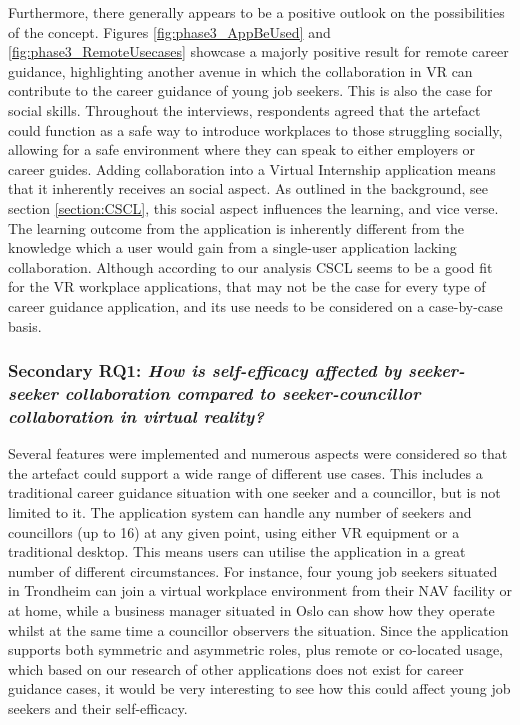 Furthermore, there generally appears to be a positive outlook on the possibilities of the concept. Figures \ref{fig:phase3_AppBeUsed} and \ref{fig:phase3_RemoteUsecases} showcase a majorly positive result for remote career guidance, highlighting another avenue in which the collaboration in VR can contribute to the career guidance of young job seekers. This is also the case for social skills. Throughout the interviews, respondents agreed that the artefact could function as a safe way to introduce workplaces to those struggling socially, allowing for a safe environment where they can speak to either employers or career guides. Adding collaboration into a Virtual Internship application means that it inherently receives an social aspect. As outlined in the background, see section \ref{section:CSCL}, this social aspect influences the  learning, and vice verse. The learning outcome from the application is inherently different from the knowledge which a user would gain from a single-user application lacking collaboration. Although according to our analysis CSCL seems to be a good fit for the VR workplace applications, that may not be the case for every type of career guidance application, and its use needs to be considered on a case-by-case basis.  







\subsubsection{Secondary RQ1: \textit{How is self-efficacy affected by seeker-seeker collaboration compared to seeker-councillor collaboration in virtual reality?}} 

Several features were implemented and numerous aspects were considered so that the artefact could support a wide range of different use cases. This includes a traditional career guidance situation with one seeker and a councillor, but is not limited to it. The application system can handle any number of seekers and councillors (up to 16) at any given point, using either VR equipment or a traditional desktop. This means users can utilise the application in a great number of different circumstances. For instance, four young job seekers situated in Trondheim can join a virtual workplace environment from their NAV facility or at home, while a business manager situated in Oslo can show how they operate whilst at the same time a councillor observers the situation.           
Since the application supports both symmetric and asymmetric roles, plus remote or co-located usage, which based on our research of other applications does not exist for career guidance cases, it would be very interesting to see how this could affect young job seekers and their self-efficacy. 


